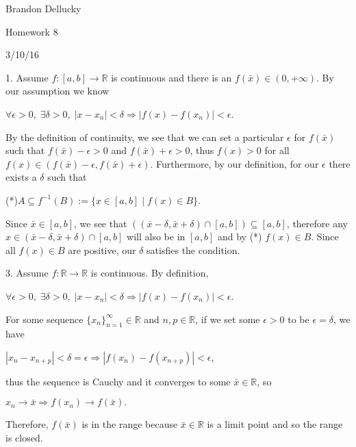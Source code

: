 \documentclass[12pt]{article}
\begin{document}
\centerline{Brandon Dellucky}
\centerline{Homework 8}
\centerline{3/10/16}
\centerline{}

1. Assume $f:[a,b] \rightarrow \mathbb{R}$ is continuous and there is an $f(\bar{x}) \in (0, +\infty)$. By our assumption we know
\newline
\centerline{}
\centerline{$\forall \epsilon > 0, \;\exists \delta > 0, \;|x - x_n| < \delta \Rightarrow |f(x) - f(x_n)| < \epsilon$.}
\centerline{}
By the definition of continuity, we see that we can set a particular $\epsilon$ for $f(\bar{x})$ such that $f(\bar{x}) - \epsilon > 0$ and $f(\bar{x}) + \epsilon > 0$, thus $f(x) > 0$ for all $f(x) \in (f(\bar{x}) - \epsilon, f(\bar{x}) + \epsilon)$. Furthermore, by our definition, for our $\epsilon$ there exists a $\delta$ such that
\centerline{}
\centerline{(*)$A \subseteq f^{-1}(B) := \{x \in [a,b]\;|\;f(x) \in B\}$.}
\centerline{}
Since $\bar{x} \in [a,b]$, we see that $((\bar{x} - \delta, \bar{x} + \delta) \cap [a,b]) \subseteq [a,b]$, therefore any $x \in (\bar{x} - \delta, \bar{x} + \delta) \cap [a,b]$ will also be in $[a,b]$ and by (*) $f(x) \in B$. Since all $f(x) \in B$ are positive, our $\delta$ satisfies the condition.
\newline
\centerline{}
3. Assume $f:\mathbb{R} \rightarrow \mathbb{R}$ is continuous. By definition, 
\newline
\centerline{}
\centerline{$\forall \epsilon > 0, \;\exists \delta > 0, \;|x - x_n| < \delta \Rightarrow |f(x) - f(x_n)| < \epsilon$.}
\centerline{}
For some sequence $\{x_n\}_{n=1}^\infty \in \mathbb{R}$ and $n,p \in \mathbb{R}$, if we set some $\epsilon > 0$ to be $\epsilon = \delta$, we have
\newline
\centerline{}
\centerline{$|x_n - x_{n+p}| < \delta = \epsilon \Rightarrow |f(x_n) - f(x_{n+p})| < \epsilon$,}
\centerline{}
thus the sequence is Cauchy and it converges to some $\bar{x} \in \mathbb{R}$, so 
\newline
\centerline{}
\centerline{$x_n \rightarrow \bar{x} \Rightarrow f(x_n) \rightarrow f(\bar{x}).$}
\centerline{}
Therefore, $f(\bar{x})$ is in the range because $\bar{x} \in \mathbb{R}$ is a limit point and so the range is closed.	
\end{document}

